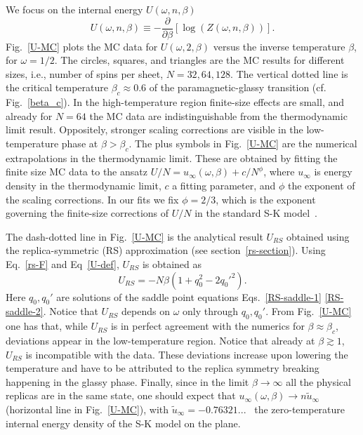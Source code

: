 \documentclass[twocolumn,superscriptaddress,prb,10pt]{revtex4-1}
\begin{document}
We focus on the internal energy $U(\omega,n,
\beta)$ 
%
\begin{equation}
\label{U-def}
U(\omega,n,\beta)\equiv-\frac{\partial}{\partial\beta}
[\log(Z(\omega,n,\beta))]. 
\end{equation}
%  
Fig.~\ref{U-MC} plots the MC data for $U(\omega,2,\beta)$ versus the inverse temperature 
$\beta$, for $\omega=1/2$. The circles, squares, and triangles are the MC results for 
different sizes, i.e., number of spins per sheet, $N=32,64,128$. The vertical dotted line 
is the critical temperature $\beta_c\approx 0.6$ of the paramagnetic-glassy transition 
(cf. Fig.~\ref{beta_c}). In the high-temperature region finite-size effects are small, 
and already for $N=64$ the MC data are indistinguishable from the thermodynamic limit 
result. Oppositely, stronger scaling corrections are visible in the low-temperature phase at 
$\beta>\beta_c$. The plus symbols in Fig.~\ref{U-MC} are the numerical extrapolations in 
the thermodynamic limit. These are obtained by fitting the finite size MC data 
to the ansatz $U/N=u_{\infty}(\omega,\beta)+c/N^{\phi}$, where 
$u_{\infty}$ is energy density in the thermodynamic limit, $c$ a fitting parameter, and 
$\phi$ the exponent of the scaling corrections. In our fits we fix $\phi=2/3$, which 
is the exponent governing the finite-size corrections of $U/N$ in 
the standard S-K model~\cite{billoire-2007,aspelmeier-2008}. 

The dash-dotted line in Fig.~\ref{U-MC} is the analytical result $U_{RS}$ obtained using 
the replica-symmetric (RS) approximation (see section~\ref{rs-section}). 
Using Eq.~\eqref{rs-F} and Eq~\eqref{U-def}, $U_{RS}$  is obtained as   
%
\begin{equation}
U_{RS}=-N\beta(1+q_0^2-2q_0'^2). 
\label{U}
\end{equation}
% 
Here $q_0,q_0'$ are solutions of the saddle point equations Eqs.~\eqref{RS-saddle-1}
\eqref{RS-saddle-2}. Notice that $U_{RS}$ depends on $\omega$ only through $q_0,q_0'$. 
From Fig.~\ref{U-MC} one has that, while $U_{RS}$ is in perfect agreement with the 
numerics for $\beta\approx\beta_c$, deviations appear in the low-temperature region. 
Notice that already at $\beta\gtrsim 1$, $U_{RS}$ is incompatible with the data. 
These deviations increase upon lowering the temperature and  have  to be attributed 
to the replica symmetry breaking happening in the glassy phase. Finally, since in 
the limit $\beta\to\infty$ all the physical replicas are in the same state, 
one should expect that $u_\infty(\omega,\beta)\to n \tilde u_\infty$ (horizontal line in 
Fig.~\ref{U-MC}), with $\tilde u_{\infty}=-0.76321...$~\cite{parisi-1979,parisi-1983} the 
zero-temperature internal energy density of the S-K model on the plane. 
\end{document}
